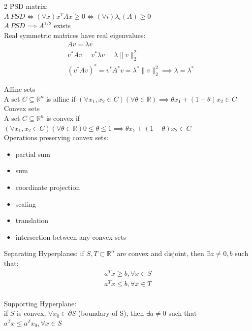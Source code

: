 \documentclass[8pt]{extarticle}
\newcommand{\R}{\mathbb{R}}
\begin{document}
\begin{multicols*}{2}
  PSD matrix:\\
  $A\ PSD \iff (\forall x) x^TAx \geq 0 \iff (\forall i) \lambda_i(A) \geq 0$\\
  $A\ PSD \implies A^{1/2}$ exists\\

  Real symmetric matrices have real eigenvalues:
  \begin{align*}
    &Av=\lambda v\\ 
    &v^*Av=v^*\lambda v=\lambda \|v\|_2^2\\
    &(v^* A v)^*= v^* A^* v = \lambda^* \|v\|_2^2 \implies \lambda = \lambda^*
  \end{align*}

  Affine sets\\
  A set $C \subseteq \R^n$ is affine if $(\forall x_1, x_2 \in C)(\forall \theta \in \R) \implies \theta x_1 +(1-\theta) x_2 \in C$\\
  
  Convex sets\\
  A set $C \subseteq \R^n$ is convex if $(\forall x_1,x_2 \in C)(\forall \theta \in \R) 0 \leq \theta \leq 1 \implies \theta x_1 +(1-\theta)x_2 \in C$\\

  Operations preserving convex sets:
  \begin{itemize}
  \item partial sum
  \item sum
  \item coordinate projection
  \item scaling
  \item translation
  \item intersection between any convex sets
  \end{itemize}  

  Separating Hyperplanes: if $S,T \subset \R^n$ are convex and disjoint, then $\exists a \neq 0, b$ such that:\\
  \begin{align*}
    a^Tx \geq b, \forall x \in S\\
    a^Tx \leq b, \forall x \in T\\
  \end{align*}

  Supporting Hyperplane:\\
  if $S$ is convex, $\forall x_0 \in \partial S$ (boundary of S), then $\exists a \neq 0$ such that $a^Tx \leq a^Tx_0, \forall x \in S$\\
  

\end{multicols*}
\end{document}
